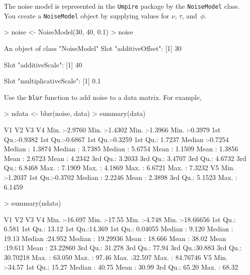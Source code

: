 \documentclass[11pt]{article}
\def\rcode#1{\texttt{#1}}
\begin{document}
The noise model is represented in the \rcode{Umpire} package by the
\rcode{NoiseModel} class.  You create a \rcode{NoiseModel} object by
supplying values for $\nu$, $\tau$, and~$\phi$.
\begin{Schunk}
\begin{Sinput}
> noise <- NoiseModel(30, 40, 0.1)
> noise
\end{Sinput}
\begin{Soutput}
An object of class "NoiseModel"
Slot "additiveOffset":
[1] 30

Slot "additiveScale":
[1] 40

Slot "multiplicativeScale":
[1] 0.1
\end{Soutput}
\end{Schunk}
Use the \rcode{blur} function to add noise to a data matrix. For
example, 
\begin{Schunk}
\begin{Sinput}
> ndata <- blur(noise, data)
> summary(data)
\end{Sinput}
\begin{Soutput}
       V1                V2                V3                V4         
 Min.   :-2.9760   Min.   :-1.4302   Min.   :-1.3966   Min.   :-0.3979  
 1st Qu.:-0.9382   1st Qu.:-0.6867   1st Qu.:-0.3259   1st Qu.: 1.7237  
 Median :-0.7254   Median : 1.3874   Median : 3.7385   Median : 5.6754  
 Mean   : 1.1509   Mean   : 1.3856   Mean   : 2.6723   Mean   : 4.2342  
 3rd Qu.: 3.2033   3rd Qu.: 3.4707   3rd Qu.: 4.6732   3rd Qu.: 6.8468  
 Max.   : 7.1909   Max.   : 4.1869   Max.   : 6.6721   Max.   : 7.3232  
       V5         
 Min.   :-1.2037  
 1st Qu.:-0.3702  
 Median : 2.2246  
 Mean   : 2.3898  
 3rd Qu.: 5.1523  
 Max.   : 6.1459  
\end{Soutput}
\begin{Sinput}
> summary(ndata)
\end{Sinput}
\begin{Soutput}
       V1                V2               V3               V4           
 Min.   :-16.697   Min.   :-17.55   Min.   :-4.748   Min.   :-18.66656  
 1st Qu.:  6.581   1st Qu.: 13.12   1st Qu.:14.369   1st Qu.:  0.04055  
 Median :  9.120   Median : 19.13   Median :24.952   Median : 19.29936  
 Mean   : 18.666   Mean   : 38.02   Mean   :19.611   Mean   : 23.22860  
 3rd Qu.: 31.278   3rd Qu.: 77.94   3rd Qu.:30.883   3rd Qu.: 30.70218  
 Max.   : 63.050   Max.   : 97.46   Max.   :32.597   Max.   : 84.76746  
       V5        
 Min.   :-34.57  
 1st Qu.: 15.27  
 Median : 40.75  
 Mean   : 30.99  
 3rd Qu.: 65.20  
 Max.   : 68.32  
\end{Soutput}
\end{Schunk}
\end{document}
